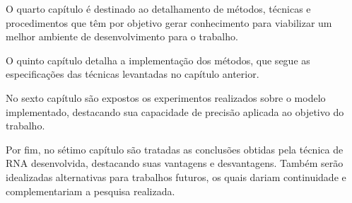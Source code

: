 O quarto capítulo é destinado ao detalhamento de métodos, técnicas e procedimentos que têm por objetivo gerar conhecimento para viabilizar um melhor ambiente de desenvolvimento para o trabalho.

O quinto capítulo detalha a implementação dos métodos, que segue as especificações das técnicas levantadas no capítulo anterior.

No sexto capítulo são expostos os experimentos realizados sobre o modelo implementado, destacando sua capacidade de precisão aplicada ao objetivo do trabalho.

Por fim, no sétimo capítulo são tratadas as conclusões obtidas pela técnica de RNA desenvolvida, destacando suas vantagens e desvantagens. Também serão idealizadas alternativas para trabalhos futuros, os quais dariam continuidade e complementariam a pesquisa realizada.